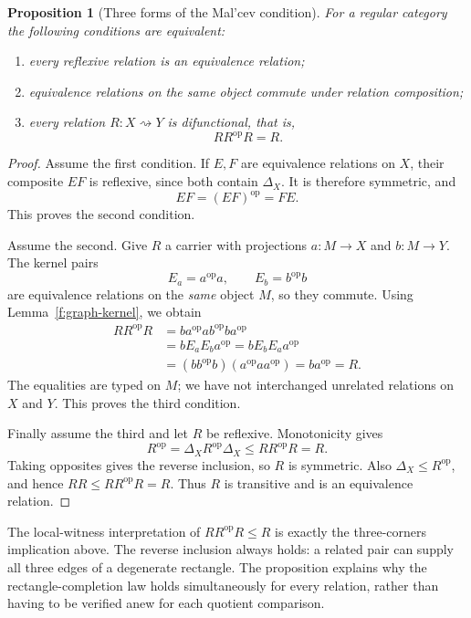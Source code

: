\documentclass[11pt]{article}
\newtheorem{proposition}[theorem]{Proposition}
\theoremstyle{definition}
\theoremstyle{remark}\newtheorem{remark}[theorem]{Remark}
\begin{document}
\begin{proposition}[Three forms of the Mal'cev condition]\label{d:difunctional}
For a regular category the following conditions are equivalent:
\begin{enumerate}
\item every reflexive relation is an equivalence relation;
\item equivalence relations on the same object commute under
relation composition;
\item every relation $R:X\rightsquigarrow Y$ is difunctional, that is,
\[
RR^{\mathrm{op}}R=R.
\]
\end{enumerate}
\end{proposition}
\begin{proof}
Assume the first condition. If $E,F$ are equivalence relations on $X$,
their composite $EF$ is reflexive, since both contain $\Delta_X$.
It is therefore symmetric, and
\[
EF=(EF)^{\mathrm{op}}=FE.
\]
This proves the second condition.

Assume the second. Give $R$ a carrier with projections
$a:M\to X$ and $b:M\to Y$. The kernel pairs
\[
E_a=a^{\mathrm{op}}a,\qquad E_b=b^{\mathrm{op}}b
\]
are equivalence relations on the \emph{same} object $M$, so they
commute. Using Lemma~\ref{f:graph-kernel}, we obtain
\begin{align*}
RR^{\mathrm{op}}R
&=ba^{\mathrm{op}}ab^{\mathrm{op}}ba^{\mathrm{op}}\\
&=bE_aE_ba^{\mathrm{op}}
 =bE_bE_aa^{\mathrm{op}}\\
&=(bb^{\mathrm{op}}b)(a^{\mathrm{op}}aa^{\mathrm{op}})
 =ba^{\mathrm{op}}=R.
\end{align*}
The equalities are typed on $M$; we have not interchanged unrelated
relations on $X$ and $Y$. This proves the third condition.

Finally assume the third and let $R$ be reflexive. Monotonicity gives
\[
R^{\mathrm{op}}=\Delta_XR^{\mathrm{op}}\Delta_X
\leq RR^{\mathrm{op}}R=R.
\]
Taking opposites gives the reverse inclusion, so $R$ is symmetric.
Also $\Delta_X\leq R^{\mathrm{op}}$, and hence
$RR\leq RR^{\mathrm{op}}R=R$. Thus $R$ is transitive and is an
equivalence relation.
\end{proof}

The local-witness interpretation of $RR^{\mathrm{op}}R\leq R$ is
exactly the three-corners implication above. The reverse inclusion
always holds: a related pair can supply all three edges of a degenerate
rectangle. The proposition explains why the rectangle-completion law
holds simultaneously for every relation, rather than having to be
verified anew for each quotient comparison.
\end{document}
